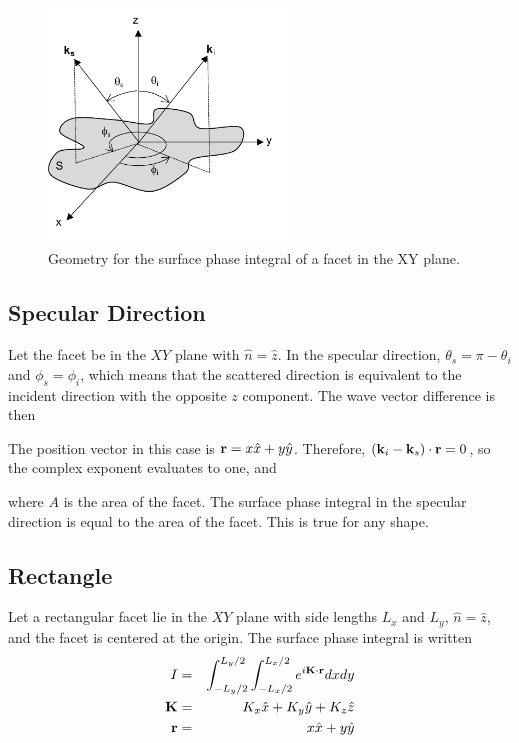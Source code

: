 \begin{figure}[H] 
   \centering
   \includegraphics[width=2.5in]{Kirchhoff/Figures/surfacephaseint} 
   \caption{Geometry for the surface phase integral of a facet in the XY plane.}
     \label{kirchhoffXY}
\end{figure}




\subsection{Specular Direction}

Let the facet be in the $XY$ plane with $\hat{n} = \hat{z}$.  In the specular direction, $\theta_s = \pi - \theta_i$ and $\phi_s = \phi_i$, which means that the scattered direction is equivalent to the incident direction with the opposite $z$ component. The wave vector difference is then

The position vector in this case is $\mathbf{r}  = x \hat{x} + y \hat{y}$.  Therefore, $(\mathbf{k}_i - \mathbf{k}_s)\cdot \mathbf{r} = 0$, so the complex exponent evaluates to one, and 

\noindent where $A$ is the area of the facet. The surface phase integral in the specular direction is equal to the area of the facet. This is true for any shape.


\subsection{Rectangle}

Let a rectangular facet lie in the $XY$ plane with side lengths $L_x$ and $L_y$, $\hat{n} = \hat{z}$, and the facet is centered at the origin. The surface phase integral is written 
\begin{eqnarray}
I &=& \int_{-L_y/2}^{L_y/2}  \int_{-L_x/2}^{L_x/2}  e^{i\mathbf{K}\cdot \mathbf{r}} dx dy \\
\mathbf{K} &=& K_x \hat{x} + K_y \hat{y} + K_z \hat{z} \\
\mathbf{r} &=& x \hat{x} + y \hat{y}
\end{eqnarray}


